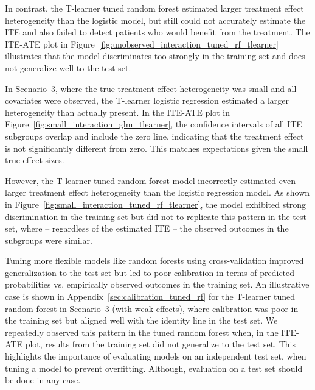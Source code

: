 In contrast, the T-learner tuned random forest estimated larger treatment effect heterogeneity than the logistic model, but still could not accurately estimate the ITE and also failed to detect patients who would benefit from the treatment. The ITE-ATE plot in Figure~\ref{fig:unobserved_interaction_tuned_rf_tlearner} illustrates that the model discriminates too strongly in the training set and does not generalize well to the test set.


\medskip


In Scenario~3, where the true treatment effect heterogeneity was small and all covariates were observed, the T-learner logistic regression estimated a larger heterogeneity than actually present. In the ITE-ATE plot in Figure~\ref{fig:small_interaction_glm_tlearner}, the confidence intervals of all ITE subgroups overlap and include the zero line, indicating that the treatment effect is not significantly different from zero. This matches expectations given the small true effect sizes.

However, the T-learner tuned random forest model incorrectly estimated even larger treatment effect heterogeneity than the logistic regression model. As shown in Figure~\ref{fig:small_interaction_tuned_rf_tlearner}, the model exhibited strong discrimination in the training set but did not to replicate this pattern in the test set, where -- regardless of the estimated ITE -- the observed outcomes in the subgroups were similar.


\medskip


Tuning more flexible models like random forests using cross-validation improved generalization to the test set but led to poor calibration in terms of predicted probabilities vs. empirically observed outcomes in the training set. An illustrative case is shown in Appendix~\ref{sec:calibration_tuned_rf} for the T-learner tuned random forest in Scenario~3 (with weak effects), where calibration was poor in the training set but aligned well with the identity line in the test set. We repeatedly observed this pattern in the tuned random forest when, in the ITE-ATE plot, results from the training set did not generalize to the test set. This highlights the importance of evaluating models on an independent test set, when tuning a model to prevent overfitting. Although, evaluation on a test set should be done in any case.

